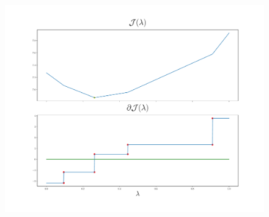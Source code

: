 \documentclass{beamer}
\begin{document}
\begin{frame}

      \begin{figure}[t!]
            \centering
            \includegraphics[width=.6\textwidth]{Chapter4/NeuroCom2021/ejemplo2_hinge.pdf}
            \label{fig:sq_error}
        \end{figure}      

\end{frame}
\end{document}
